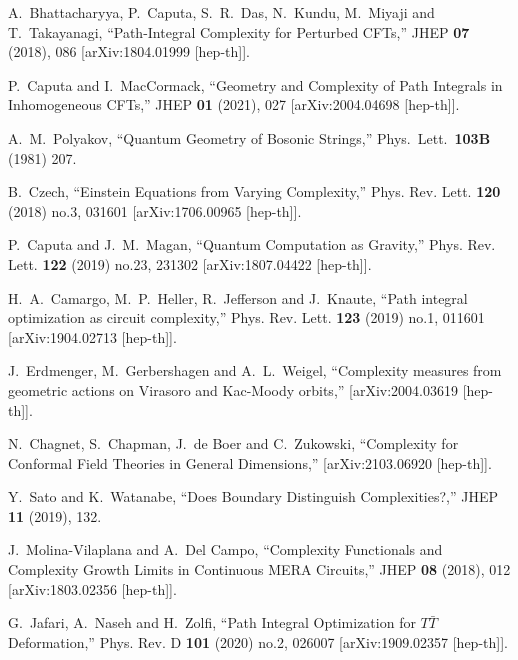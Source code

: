 \documentclass[a4paper,12pt]{article}
\begin{document}
\begin{thebibliography}{}
A.~Bhattacharyya, P.~Caputa, S.~R.~Das, N.~Kundu, M.~Miyaji and T.~Takayanagi,
``Path-Integral Complexity for Perturbed CFTs,''
JHEP \textbf{07} (2018), 086
[arXiv:1804.01999 [hep-th]].

P.~Caputa and I.~MacCormack,
``Geometry and Complexity of Path Integrals in Inhomogeneous CFTs,''
JHEP \textbf{01} (2021), 027
[arXiv:2004.04698 [hep-th]].

  A.~M.~Polyakov,
  ``Quantum Geometry of Bosonic Strings,'' 
   Phys.\ Lett.\  {\bf 103B} (1981) 207.  %
   
B.~Czech,
``Einstein Equations from Varying Complexity,''
Phys. Rev. Lett. \textbf{120} (2018) no.3, 031601
[arXiv:1706.00965 [hep-th]].


P.~Caputa and J.~M.~Magan,
``Quantum Computation as Gravity,''
Phys. Rev. Lett. \textbf{122} (2019) no.23, 231302
[arXiv:1807.04422 [hep-th]].


H.~A.~Camargo, M.~P.~Heller, R.~Jefferson and J.~Knaute,
``Path integral optimization as circuit complexity,''
Phys. Rev. Lett. \textbf{123} (2019) no.1, 011601
[arXiv:1904.02713 [hep-th]].


J.~Erdmenger, M.~Gerbershagen and A.~L.~Weigel,
``Complexity measures from geometric actions on Virasoro and Kac-Moody orbits,''
[arXiv:2004.03619 [hep-th]].

N.~Chagnet, S.~Chapman, J.~de Boer and C.~Zukowski,
``Complexity for Conformal Field Theories in General Dimensions,''
[arXiv:2103.06920 [hep-th]].

Y.~Sato and K.~Watanabe,
``Does Boundary Distinguish Complexities?,''
JHEP \textbf{11} (2019), 132.


J.~Molina-Vilaplana and A.~Del Campo,
``Complexity Functionals and Complexity Growth Limits in Continuous MERA Circuits,''
JHEP \textbf{08} (2018), 012
[arXiv:1803.02356 [hep-th]].

G.~Jafari, A.~Naseh and H.~Zolfi,
``Path Integral Optimization for $T\bar{T}$ Deformation,''
Phys. Rev. D \textbf{101} (2020) no.2, 026007
[arXiv:1909.02357 [hep-th]].


\end{thebibliography}
\end{document}
